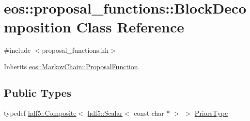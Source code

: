 \hypertarget{classeos_1_1proposal__functions_1_1BlockDecomposition}{
\section{eos::proposal\_\-functions::BlockDecomposition Class Reference}
\label{classeos_1_1proposal__functions_1_1BlockDecomposition}
}


{\ttfamily \#include $<$proposal\_\-functions.hh$>$}

Inherits \hyperlink{structeos_1_1MarkovChain_1_1ProposalFunction}{eos::MarkovChain::ProposalFunction}.\subsection*{Public Types}
\begin{DoxyCompactItemize}
\item 
typedef \hyperlink{classeos_1_1hdf5_1_1Composite}{hdf5::Composite}$<$ \hyperlink{classeos_1_1hdf5_1_1Scalar}{hdf5::Scalar}$<$ const char $\ast$ $>$ $>$ \hyperlink{classeos_1_1proposal__functions_1_1BlockDecomposition_a892047be5924542e4defaa86b30ad6fd}{PriorsType}
\end{DoxyCompactItemize}
